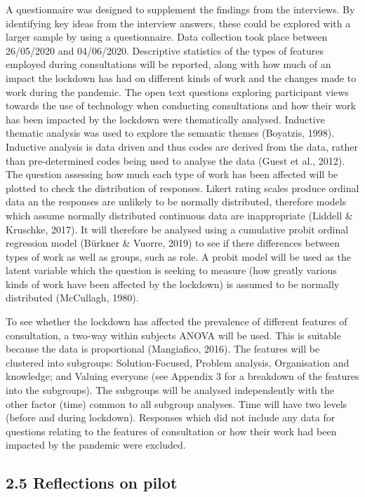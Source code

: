 \documentclass[
  english,
  man]{apa7}
\begin{document}
A questionnaire was designed to supplement the findings from the interviews. By identifying key ideas from the interview answers, these could be explored with a larger sample by using a questionnaire. Data collection took place between 26/05/2020 and 04/06/2020. Descriptive statistics of the types of features employed during consultations will be reported, along with how much of an impact the lockdown has had on different kinds of work and the changes made to work during the pandemic. The open text questions exploring participant views towards the use of technology when conducting consultations and how their work has been impacted by the lockdown were thematically analysed. Inductive thematic analysis was used to explore the semantic themes (Boyatzis, 1998). Inductive analysis is data driven and thus codes are derived from the data, rather than pre-determined codes being used to analyse the data (Guest et al., 2012). The question assessing how much each type of work has been affected will be plotted to check the distribution of responses. Likert rating scales produce ordinal data an the responses are unlikely to be normally distributed, therefore models which assume normally distributed continuous data are inappropriate (Liddell \& Kruschke, 2017). It will therefore be analysed using a cumulative probit ordinal regression model (Bürkner \& Vuorre, 2019) to see if there differences between types of work as well as groups, such as role. A probit model will be used as the latent variable which the question is seeking to measure (how greatly various kinds of work have been affected by the lockdown) is assumed to be normally distributed (McCullagh, 1980).

To see whether the lockdown has affected the prevalence of different features of consultation, a two-way within subjects ANOVA will be used. This is suitable because the data is proportional (Mangiafico, 2016). The features will be clustered into subgroups: Solution-Focused, Problem analysis, Organisation and knowledge; and Valuing everyone (see Appendix 3 for a breakdown of the features into the subgroups). The subgroups will be analysed independently with the other factor (time) common to all subgroup analyses. Time will have two levels (before and during lockdown). Responses which did not include any data for questions relating to the features of consultation or how their work had been impacted by the pandemic were excluded.

\hypertarget{reflections-on-pilot}{%
\subsection{2.5 Reflections on pilot}\label{reflections-on-pilot}}
\end{document}
